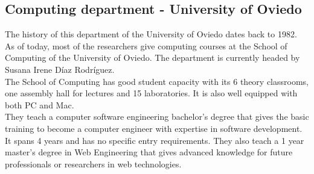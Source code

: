 \documentclass{article}
\begin{document}
\subsection{Computing department - University of Oviedo}
The history of this department of the University of Oviedo dates back to 1982. As of today, most of the researchers give computing courses at the School of Computing of the University of Oviedo.
The department is currently headed by Susana Irene Díaz Rodríguez.
\\
The School of Computing has good student capacity with its 6 theory classrooms, one assembly hall for lectures and 15 laboratories. It is also well equipped with both PC and Mac.
\\
They teach a computer software engineering bachelor’s degree that gives the basic training to become a computer engineer with expertise in software development. It spans 4 years and has no specific entry requirements.
They also teach a 1 year master’s degree in Web Engineering that gives advanced knowledge for future professionals or researchers in web technologies.
\end{document}
